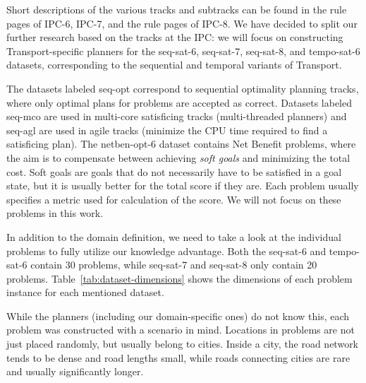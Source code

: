 Short descriptions of the various tracks and subtracks can be found in the rule pages of IPC-6,
IPC-7,
and the rule pages of IPC-8.
We have decided to split our further research based on the tracks at the IPC: we will focus on constructing
Transport-specific planners for the seq-sat-6, seq-sat-7, seq-sat-8, and tempo-sat-6 datasets,
corresponding to the sequential and temporal variants of Transport.

The datasets labeled seq-opt correspond to sequential optimality planning tracks,
where only optimal plans for problems are accepted as correct.
Datasets labeled seq-mco are used in multi-core satisficing tracks (multi-threaded planners)
and seq-agl are used in agile tracks (minimize the CPU time required to find a satisficing plan).
The netben-opt-6 dataset contains Net Benefit problems, where the aim
is to compensate between achieving \textit{soft goals} and minimizing the total cost.
Soft goals are goals that do not necessarily have to be satisfied in a goal state,
but it is usually better for the total score if they are.
Each problem usually specifies a metric used for calculation of the score.
We will not focus on 
these problems in this work.

In addition to the domain definition, we need to take a look at the individual problems to fully utilize our knowledge advantage.
Both the seq-sat-6 and tempo-sat-6 contain 30 problems, while seq-sat-7 and seq-sat-8 only contain 20 problems. Table~\ref{tab:dataset-dimensions} shows the
dimensions of each problem instance for each mentioned dataset.

While the planners (including our domain-specific ones) do not know this,
each problem was constructed with a scenario in mind. Locations in problems are not just
placed randomly, but usually belong to cities. Inside a city, the road network
tends to be dense and road lengths small, while roads connecting cities
are rare and usually significantly longer.


